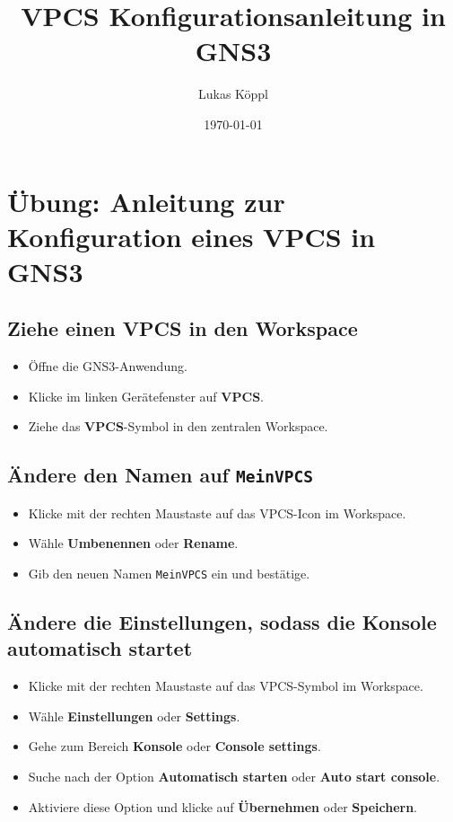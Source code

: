 \documentclass[12pt, a4paper]{article}\usepackage{listings}
\title{VPCS Konfigurationsanleitung in GNS3}
\author{Lukas Köppl}
\date{\today}
\begin{document}
\maketitle
\newpage
\tableofcontents
\newpage

\section{Übung: Anleitung zur Konfiguration eines VPCS in GNS3}

\subsection{Ziehe einen VPCS in den Workspace}
\begin{itemize}
    \item Öffne die GNS3-Anwendung.
    \item Klicke im linken Gerätefenster auf \textbf{VPCS}.
    \item Ziehe das \textbf{VPCS}-Symbol in den zentralen Workspace.
\end{itemize}

\subsection{Ändere den Namen auf \texttt{MeinVPCS}}
\begin{itemize}
    \item Klicke mit der rechten Maustaste auf das VPCS-Icon im Workspace.
    \item Wähle \textbf{Umbenennen} oder \textbf{Rename}.
    \item Gib den neuen Namen \texttt{MeinVPCS} ein und bestätige.
\end{itemize}

\subsection{Ändere die Einstellungen, sodass die Konsole automatisch startet}
\begin{itemize}
    \item Klicke mit der rechten Maustaste auf das VPCS-Symbol im Workspace.
    \item Wähle \textbf{Einstellungen} oder \textbf{Settings}.
    \item Gehe zum Bereich \textbf{Konsole} oder \textbf{Console settings}.
    \item Suche nach der Option \textbf{Automatisch starten} oder \textbf{Auto start console}.
    \item Aktiviere diese Option und klicke auf \textbf{Übernehmen} oder \textbf{Speichern}.
\end{itemize}
\end{document}
